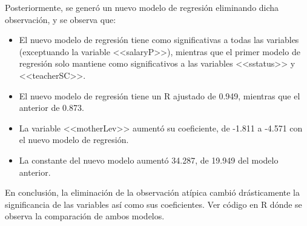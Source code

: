 \documentclass[10pt,a4paper]{article}\usepackage[]{graphicx}\usepackage[]{color}
\begin{document}
Posteriormente, se generó un nuevo modelo de regresión eliminando dicha observación, y se observa que:
\begin{itemize}
	\item El nuevo modelo de regresión tiene como significativas a todas las variables (exceptuando la variable <<salaryP>>), mientras que el primer modelo de regresión solo mantiene como significativos a las variables <<sstatus>> y <<teacherSC>>.
	\item El nuevo modelo de regresión tiene un R ajustado de 0.949, mientras que el anterior de 0.873.
	\item La variable <<motherLev>> aumentó su coeficiente, de -1.811 a -4.571 con el nuevo modelo de regresión.
	\item La constante del nuevo modelo aumentó 34.287, de 19.949 del modelo anterior.
\end{itemize}

En conclusión, la eliminación de la observación atípica cambió drásticamente la significancia de las variables así como sus coeficientes. Ver código en R dónde se observa la comparación de ambos modelos.
\end{document}

